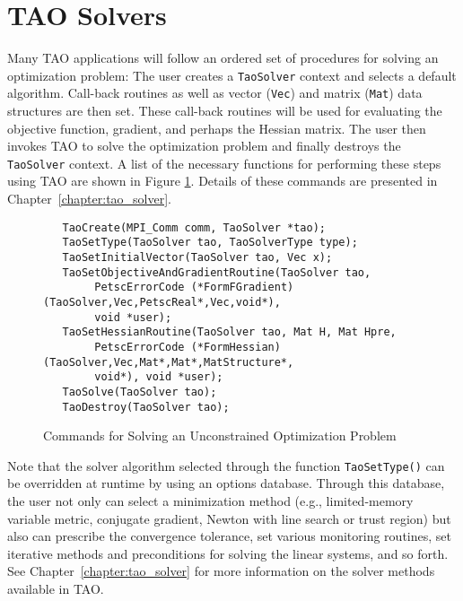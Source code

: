 \section{TAO Solvers}

Many TAO applications will follow an ordered set of procedures for 
solving an optimization problem:
The user creates a \texttt{TaoSolver} context and selects a default algorithm. 
Call-back routines as well as vector (\texttt{Vec}) and matrix (\texttt{Mat}) 
data structures are then set.  These call-back routines will be used for 
evaluating the objective function, gradient, and perhaps the Hessian 
matrix.  The user then invokes TAO to solve the optimization problem and 
finally destroys
the \texttt{TaoSolver} context. A list of the necessary functions for 
performing these steps
using TAO are shown in Figure \ref{fig:tao_commands}.  Details of these commands are presented in
Chapter~\ref{chapter:tao_solver}.

 
 
 
\begin{figure}[H]
\begin{verbatim}
   TaoCreate(MPI_Comm comm, TaoSolver *tao); 
   TaoSetType(TaoSolver tao, TaoSolverType type);
   TaoSetInitialVector(TaoSolver tao, Vec x);
   TaoSetObjectiveAndGradientRoutine(TaoSolver tao, 
        PetscErrorCode (*FormFGradient)(TaoSolver,Vec,PetscReal*,Vec,void*), 
        void *user);
   TaoSetHessianRoutine(TaoSolver tao, Mat H, Mat Hpre,
        PetscErrorCode (*FormHessian)(TaoSolver,Vec,Mat*,Mat*,MatStructure*,
        void*), void *user);
   TaoSolve(TaoSolver tao);
   TaoDestroy(TaoSolver tao);
\end{verbatim}
\caption{Commands for Solving an Unconstrained Optimization Problem
\label{fig:tao_commands}}
\end{figure}

Note that the solver algorithm selected through the function 
\texttt{TaoSetType()} can be overridden
at runtime by using an options database.  Through this
database, the user not only can select a minimization method (e.g.,
limited-memory variable metric, conjugate gradient, Newton with line
search or trust region) but also can prescribe the convergence
tolerance, set various monitoring routines, set iterative methods
and preconditions for solving the linear systems, and so forth.  See 
Chapter~\ref{chapter:tao_solver} for more information on the 
solver methods available in TAO.

